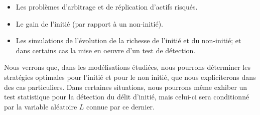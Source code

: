 \documentclass[../finalreport.tex]{subfiles}
\begin{document}
\vspace{5mm}

\begin{itemize}
\item Les problèmes d'arbitrage et de réplication d'actifs risqués.
\item Le gain de l'initié (par rapport à un non-initié).
\item Les simulations de l'évolution de la richesse de l'initié et du non-initié; et dans certains cas la mise en oeuvre d'un test de détection.
\end{itemize}

\vspace{5mm}

\par Nous verrons que, dans les modélisations étudiées, nous pourrons déterminer les stratégies optimales pour l'initié et pour le non initié, que nous expliciterons dans des cas particuliers. Dans certaines situations, nous pourrons même exhiber un test statistique pour la détection du délit d'initié, mais celui-ci sera conditionné par la variable aléatoire $L$ connue par ce dernier.
\end{document}
